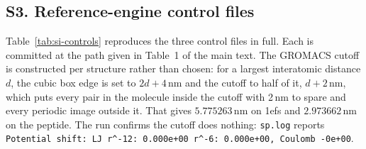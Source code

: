 \subsection*{S3. Reference-engine control files}

Table~\ref{tab:si-controls} reproduces the three control files in full.
Each is committed at the path given in Table~1 of the main text. The GROMACS
cutoff is constructed per structure rather than chosen: for a largest
interatomic distance $d$, the cubic box edge is set to $2d+4$\,nm and the
cutoff to half of it, $d+2$\,nm, which puts every pair in the molecule
inside the cutoff with 2\,nm to spare and every periodic image outside it. That
gives $5.775263$\,nm on 1efs and $2.973662$\,nm on the peptide.
The run confirms the cutoff does nothing: \texttt{sp.log} reports
\texttt{Potential shift: LJ r\^{}-12: 0.000e+00 r\^{}-6: 0.000e+00,
Coulomb -0e+00}.

